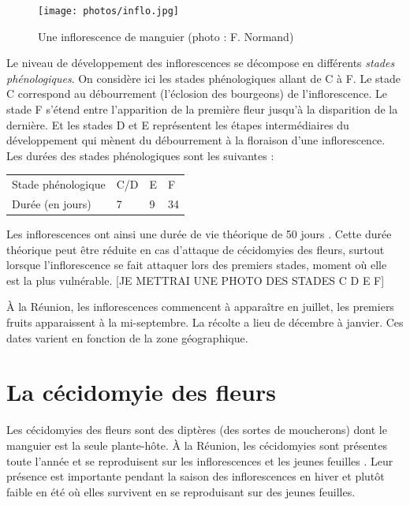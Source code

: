 \begin{figure}[ht]
 \centering
 \texttt{[image: photos/inflo.jpg]}
 \caption{Une inflorescence de manguier (photo : F. Normand)}
 \label{fig:inflo}
\end{figure}




Le niveau de développement des inflorescences se décompose en différents \emph{stades phénologiques}.
On considère ici les stades phénologiques allant de C à F.
Le stade C correspond au débourrement (l'éclosion des bourgeons) de l'inflorescence.
Le stade F s'étend entre l'apparition de la première fleur jusqu'à la disparition de la dernière.
Et les stades D et E représentent les étapes intermédiaires du développement qui mènent du débourrement à la floraison d'une inflorescence.
Les durées des stades phénologiques sont les suivantes :
\begin{center}
\begin{tabular}{llll}
Stade phénologique & C/D & E & F\\
Durée (en jours) & 7 & 9 & 34
\end{tabular}
\end{center}
Les inflorescences ont ainsi une durée de vie théorique de 50 jours \citep{laurie}.
Cette durée théorique peut être réduite en cas d'attaque de cécidomyies des fleurs, surtout lorsque l'inflorescence se fait attaquer lors des premiers stades, moment où elle est la plus vulnérable.
[JE METTRAI UNE PHOTO DES STADES C D E F]

À la Réunion, les inflorescences commencent à apparaître en juillet, les premiers fruits apparaissent à la mi-septembre. 
La récolte a lieu de décembre à janvier.
Ces dates varient en fonction de la zone géographique.






\section{La cécidomyie des fleurs}
\label{chap:cecido}

Les cécidomyies des fleurs sont des diptères (des sortes de moucherons) dont le manguier est la seule plante-hôte.
À la Réunion, les cécidomyies sont présentes toute l'année et se reproduisent sur les inflorescences et les jeunes feuilles \citep{paul}.
Leur présence est importante pendant la saison des inflorescences en hiver et plutôt faible en été où elles survivent en se reproduisant sur des jeunes feuilles.

